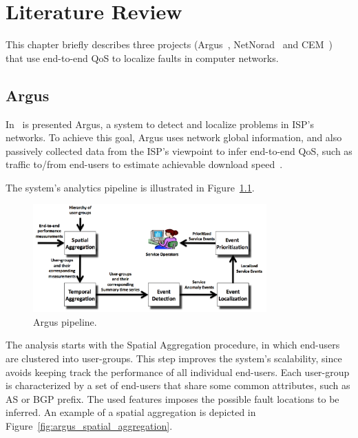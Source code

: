 \chapter{Literature Review}

This chapter briefly describes three projects
(Argus~\cite{argus_end_to_end_service_anomaly_detection_and_localization_from_an_isps_point_of_view},
NetNorad~\cite{netnorad}
and CEM~\cite{crowdsourcing_service_level_network_event_monitoring})
that use end-to-end QoS to localize faults in computer networks.

\section{Argus}

In~\cite{argus_end_to_end_service_anomaly_detection_and_localization_from_an_isps_point_of_view}
is presented Argus, a system to
detect and localize problems in ISP's networks. To achieve this goal, Argus uses
network global information, and also passively collected data from the ISP's
viewpoint to infer
end-to-end QoS, such as traffic to/from end-users to estimate achievable
download
speed~\cite{speed_testing_without_speed_tests_estimating_achievable_download_speed_from_passive_measurements}.

The system's analytics pipeline is illustrated in
Figure~\ref{fig:argus_pipeline}.

\begin{figure}[H]
    \centering
    \includegraphics[width=0.8\textwidth]{./figures/literature_review/argus_pipeline.png}
    \caption{Argus pipeline.~\cite{argus_end_to_end_service_anomaly_detection_and_localization_from_an_isps_point_of_view}}
\label{fig:argus_pipeline}
\end{figure}%

The analysis starts with the Spatial Aggregation procedure, in which
end-users are clustered into user-groups. This step improves the system's
scalability, since avoids keeping track the performance of all
individual end-users.
Each user-group is characterized by a set of end-users that share some common
attributes, such as AS or BGP prefix. The used features imposes the possible
fault locations to be inferred.
An example of a spatial aggregation is depicted in
Figure~\ref{fig:argus_spatial_aggregation}.

